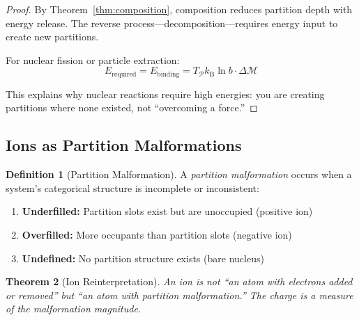 \documentclass[twocolumn,10pt,a4paper]{article}
\newtheorem{theorem}{Theorem}[section]
\theoremstyle{definition}
\newtheorem{definition}[theorem]{Definition}
\theoremstyle{remark}
\newcommand{\kB}{k_{\mathrm{B}}}
\newcommand{\Partition}{\mathcal{P}}
\newcommand{\Depth}{\mathcal{M}}
\begin{document}
\begin{proof}
By Theorem~\ref{thm:composition}, composition reduces partition depth with energy release. The reverse process---decomposition---requires energy input to create new partitions.

For nuclear fission or particle extraction:
\begin{equation}
    E_{\text{required}} = E_{\text{binding}} = T_{\Partition} \kB \ln b \cdot \Delta\Depth
\end{equation}

This explains why nuclear reactions require high energies: you are creating partitions where none existed, not ``overcoming a force.''
\end{proof}

\subsection{Ions as Partition Malformations}

\begin{definition}[Partition Malformation]
\label{def:malformation}
A \emph{partition malformation} occurs when a system's categorical structure is incomplete or inconsistent:
\begin{enumerate}
    \item \textbf{Underfilled:} Partition slots exist but are unoccupied (positive ion)
    \item \textbf{Overfilled:} More occupants than partition slots (negative ion)
    \item \textbf{Undefined:} No partition structure exists (bare nucleus)
\end{enumerate}
\end{definition}

\begin{theorem}[Ion Reinterpretation]
\label{thm:ion_reinterpret}
An ion is not ``an atom with electrons added or removed'' but ``an atom with partition malformation.'' The charge is a measure of the malformation magnitude.
\end{theorem}
\end{document}

